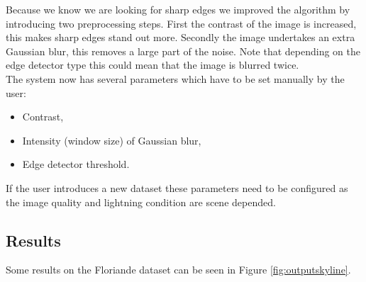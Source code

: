Because we know we are looking for sharp edges we improved the algorithm by
introducing two preprocessing steps. First the contrast of the image is
increased, this makes sharp edges stand out more.  Secondly the image undertakes
an extra Gaussian blur, this removes a large part of the noise. Note that
depending on the edge detector type this could mean that the image is blurred
twice.\\


The system now has several parameters which have to be set manually by the user:
\begin{itemize}
	\item Contrast,
	\item Intensity (window size) of Gaussian blur,
	\item Edge detector threshold.
\end{itemize}

If the user introduces a new dataset these parameters need to be configured
as the image quality and lightning condition are scene depended.


\subsection{Results}%
Some results on the Floriande dataset %
 can be seen in Figure \ref{fig:outputskyline}.



